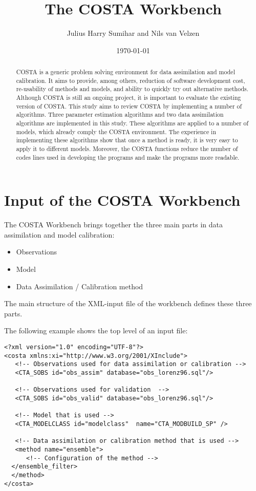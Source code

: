\documentclass[a4paper,12pt]{article}
\title{The COSTA Workbench}
\author{Julius Harry Sumihar and Nils van Velzen}
\date{\today}
\begin{document}


\tableofcontents


\begin{abstract}
COSTA is a generic problem solving environment for data assimilation and
model calibration. It aims to provide, among others, reduction of software
development cost, re-usability of methods and models, and ability to quickly
try out alternative methods. Although COSTA is still an ongoing project, it
is important to evaluate the existing version of COSTA. This study aims to
review COSTA by implementing a number of algorithms. Three parameter
estimation algorithms and two data assimilation algorithms are implemented
in this study. These algorithms are applied to a number of models, which
already comply the COSTA environment. The experience in implementing these
algorithms show that once a method is ready, it is very easy to apply it to
different models. Moreover, the COSTA functions reduce the number of codes
lines used in developing the programs and make the programs more readable.
\end{abstract}

\section{Input of the COSTA Workbench}
The COSTA Workbench brings together the three main parts in data
assimilation and model calibration:
\begin{itemize}
\item Observations
\item Model
\item Data Assimilation / Calibration method
\end{itemize}

The main structure of the XML-input file of the workbench defines these
three parts. 




The following example shows the top level of an input file:

\begin{verbatim}
<?xml version="1.0" encoding="UTF-8"?>
<costa xmlns:xi="http://www.w3.org/2001/XInclude">
   <!-- Observations used for data assimilation or calibration -->
   <CTA_SOBS id="obs_assim" database="obs_lorenz96.sql"/>
   
   <!-- Observations used for validation  -->
   <CTA_SOBS id="obs_valid" database="obs_lorenz96.sql"/>
   
   <!-- Model that is used -->
   <CTA_MODELCLASS id="modelclass"  name="CTA_MODBUILD_SP" />

   <!-- Data assimilation or calibration method that is used -->
   <method name="ensemble">
      <!-- Configuration of the method -->
  </ensemble_filter>
  </method>
</costa>
\end{verbatim}
\end{document}
